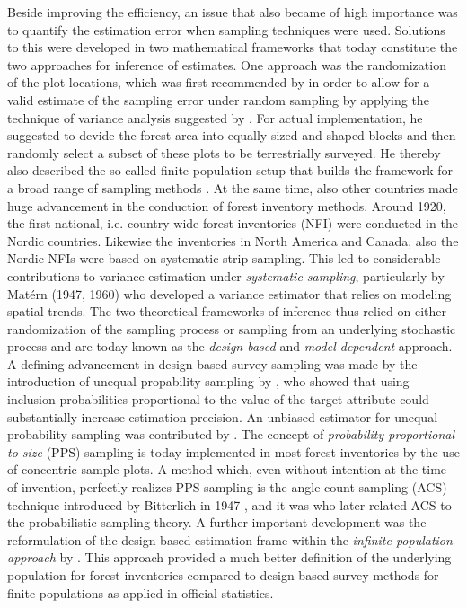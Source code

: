 Beside improving the efficiency, an issue that also became of high importance was to quantify the estimation error when sampling techniques were used. Solutions to this were developed in two mathematical frameworks that today constitute the two approaches for inference of estimates. One approach was the randomization of the plot locations, which was first recommended by \citet{hasel1938} in order to allow for a valid estimate of the sampling error under random sampling by applying the technique of variance analysis suggested by \citet{fisher1925}. For actual implementation, he suggested to devide the forest area into equally sized and shaped blocks and then randomly select a subset of these plots to be terrestrially surveyed. He thereby also described the so-called finite-population setup that builds the framework for a broad range of sampling methods \citep{schreuder1993}. At the same time, also other countries made huge advancement in the conduction of forest inventory methods. Around 1920, the first national, i.e. country-wide forest inventories (NFI) were conducted in the Nordic countries. Likewise the inventories in North America and Canada, also the Nordic NFIs were based on systematic strip sampling. This led to considerable contributions to variance estimation under \textit{systematic sampling}, particularly by Mat\'{e}rn (1947, 1960) who developed a variance estimator that relies on modeling spatial trends. The two theoretical frameworks of inference thus relied on either randomization of the sampling process or sampling from an underlying stochastic process and are today known as the \textit{design-based} and \textit{model-dependent} approach. A defining advancement in design-based survey sampling was made by the introduction of unequal propability sampling by \citet{hansen1943}, who showed that using inclusion probabilities proportional to the value of the target attribute could substantially increase estimation precision. An unbiased estimator for unequal probability sampling was contributed by \citet{horvitz1952}. The concept of \textit{probability proportional to size} (PPS) sampling is today implemented in most forest inventories by the use of concentric sample plots. A method which, even without intention at the time of invention, perfectly realizes PPS sampling is the angle-count sampling (ACS) technique introduced by Bitterlich in 1947 \citep{bitterlich1984}, and it was \citet{grosenbaugh1958} who later related ACS to the probabilistic sampling theory. A further important development was the reformulation of the design-based estimation frame within the \textit{infinite population approach} by \citet{mandallaz2008}. This approach provided a much better definition of the underlying population for forest inventories compared to design-based survey methods for finite populations as applied in official statistics.\par

